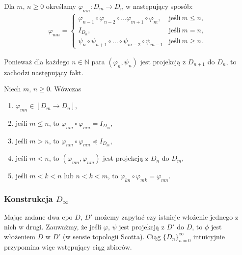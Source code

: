 \begin{definicja}%
Dla \(m,\,n\geq 0\) określamy \(\varphi_{mn}:D_m \to D_n\) w następujący sposób:
\begin{align*}
\varphi_{mn} =
\begin{cases}
\varphi_{n-1} \circ \varphi_{n-2} \circ \dots \varphi_{m+1} \circ \varphi_m, & \text{jeśli}\ m\leq n,\\
I_{D_n}, & \text{jeśli}\ m=n,\\
\psi_n \circ \psi_{n+1} \circ \dots \circ \psi_{m-2}\circ \psi_{m-1} & \text{jeśli}\ m\geq n.
\end{cases}
\end{align*}
\end{definicja}

Ponieważ dla każdego \(n\in \mathbb{N}\) para \((\varphi_n, \psi_n)\) jest projekcją z \(D_{n+1}\) do \(D_n\), to zachodzi następujący fakt.

\begin{fakt}%
Niech \(m,\,n\geq 0\). Wówczas
\begin{enumerate}[label={(\roman*)}, ref={(\roman*)}] 
  \setlength\itemsep{0em}
\item \(\varphi_{mn}\in [D_m\to D_n]\),
\item jeśli \(m\leq n\), to \(\varphi_{nm}\circ \varphi_{mn} = I_{D_m}\),
\item jeśli \(m>n\), to \(\varphi_{nm}\circ \varphi_{mn} \preceq I_{D_m}\),
\item jeśli \(m<n\), to \((\varphi_{mn},\varphi_{nm})\) jest projekcją z \(D_n\) do \(D_m\),
\item jeśli \(m<k<n\) lub \(n<k<m\), to \(\varphi_{kn}\circ\varphi_{mk}=\varphi_{mn}\).
\end{enumerate}
\end{fakt}

\subsubsection{Konstrukcja \(D_\infty\)}

Mając zadane dwa cpo \(D\), \(D'\) możemy zapytać czy istnieje włożenie jednego z nich w drugi. Zauważmy, że jeśli \(\varphi,\,\psi\) jest projekcją z \(D'\) do \(D\), to \(\phi\) jest włożeniem \(D\) w \(D'\) (w sensie topologii Scotta). Ciąg \(\{D_n\}_{n=0}^\infty\) intuicyjnie przypomina więc wstępujący ciąg zbiorów.

